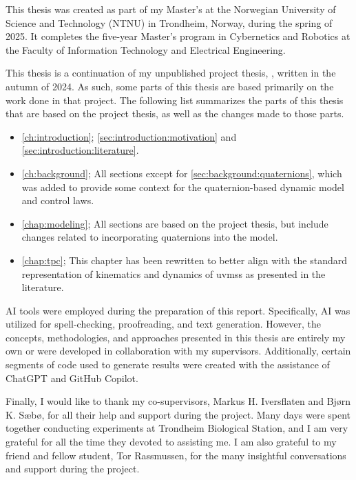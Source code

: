 This thesis was created as part of my Master's at the Norwegian University of Science and Technology (NTNU) in Trondheim, Norway, during the spring of 2025. It completes the five-year Master's program in Cybernetics and Robotics at the Faculty of Information Technology and Electrical Engineering.

This thesis is a continuation of my unpublished project thesis, , written in the autumn of 2024. As such, some parts of this thesis are based primarily on the work done in that project. The following list
summarizes the parts of this thesis that are based on the project thesis, as well as the changes made to those parts.

\begin{itemize}
    \item \autoref{ch:introduction}; \autoref{sec:introduction:motivation} and \autoref{sec:introduction:literature}.
    \item \autoref{ch:background}; All sections except for \autoref{sec:background:quaternions}, which was added to provide some context for the quaternion-based dynamic model and control laws.
    \item \autoref{chap:modeling}; All sections are based on the project thesis, but include changes related to incorporating quaternions into the model.
    \item \autoref{chap:tpc}; This chapter has been rewritten to better align with the standard representation of kinematics and dynamics of \glspl{uvms} as presented in the literature.
\end{itemize}

AI tools were employed during the preparation of this report. Specifically, AI was utilized for spell-checking, proofreading, and text generation. However, the concepts, methodologies, and approaches presented in this thesis are entirely my own or were developed in collaboration with my supervisors. Additionally, certain segments of code used to generate results were created with the assistance of ChatGPT and GitHub Copilot.

Finally, I would like to thank my co-supervisors, Markus H. Iversflaten and Bjørn K. Sæbø, for all their help and support during the project. Many days were spent together conducting experiments at Trondheim Biological Station, and I am very grateful for all the time they devoted to assisting me. I am also grateful to my friend and fellow student, Tor Rassmussen, for the many insightful conversations and support during the project.
